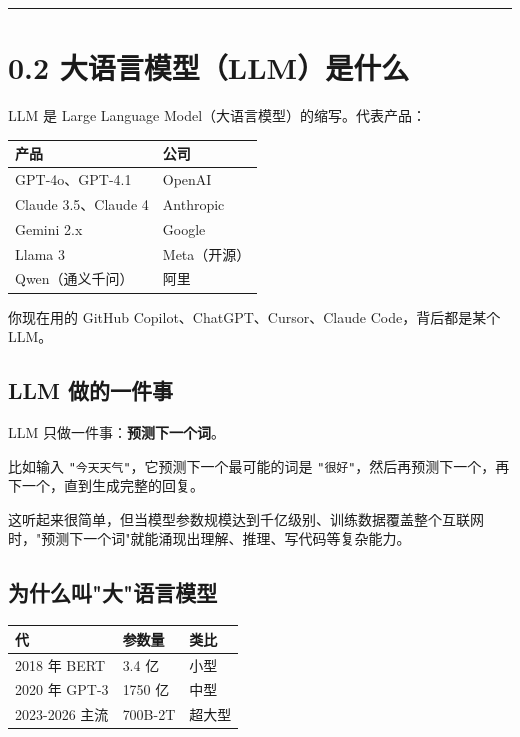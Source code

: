 \bigskip\hrule\bigskip

\section{0.2 大语言模型（LLM）是什么}

LLM 是 Large Language Model（大语言模型）的缩写。代表产品：


\begingroup
\scriptsize
\setlength{\tabcolsep}{3pt}
\begin{longtable}{|p{}|p{}|}
\hline
产品 & 公司 \\ \hline
GPT-4o、GPT-4.1 & OpenAI \\ \hline
Claude 3.5、Claude 4 & Anthropic \\ \hline
Gemini 2.x & Google \\ \hline
Llama 3 & Meta（开源） \\ \hline
Qwen（通义千问） & 阿里 \\ \hline
\end{longtable}
\endgroup

你现在用的 GitHub Copilot、ChatGPT、Cursor、Claude Code，背后都是某个 LLM。


\subsection{LLM 做的一件事}

LLM 只做一件事：\textbf{预测下一个词}。


比如输入 \texttt{"今天天气"}，它预测下一个最可能的词是 \texttt{"很好"}，然后再预测下一个，再下一个，直到生成完整的回复。


这听起来很简单，但当模型参数规模达到千亿级别、训练数据覆盖整个互联网时，"预测下一个词"就能涌现出理解、推理、写代码等复杂能力。


\subsection{为什么叫"大"语言模型}

\begingroup
\scriptsize
\setlength{\tabcolsep}{3pt}
\begin{longtable}{|p{}|p{}|p{}|}
\hline
代 & 参数量 & 类比 \\ \hline
2018 年 BERT & 3.4 亿 & 小型 \\ \hline
2020 年 GPT-3 & 1750 亿 & 中型 \\ \hline
2023-2026 主流 & 700B-2T & 超大型 \\ \hline
\end{longtable}
\endgroup


